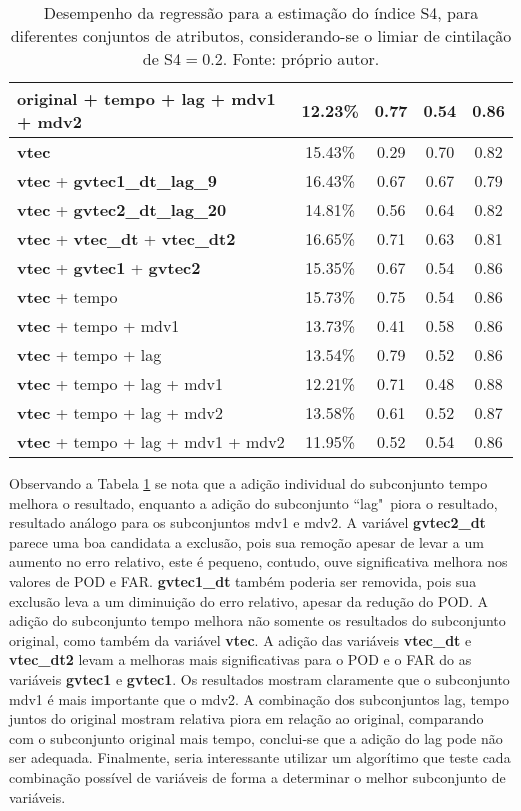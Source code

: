 \begin{table}
\begin{center}
\begin{tabular}{|l|c|c|c|c|}
original + tempo + lag + mdv1 + mdv2	       & 12.23\%	& 0.77	& 0.54	& 0.86 \\ \hline
{\bf vtec}	                               & 15.43\%	& 0.29	& 0.70	& 0.82 \\ \hline
{\bf vtec} + {\bf gvtec1\_dt\_lag\_9}          & 16.43\%        & 0.67  & 0.67  & 0.79 \\ \hline
{\bf vtec} + {\bf gvtec2\_dt\_lag\_20}         & 14.81\%        & 0.56  & 0.64  & 0.82 \\ \hline
{\bf vtec} + {\bf vtec\_dt} + {\bf vtec\_dt2}  & 16.65\%	& 0.71	& 0.63	& 0.81 \\ \hline
{\bf vtec} + {\bf gvtec1} + {\bf gvtec2}       & 15.35\%	& 0.67	& 0.54	& 0.86 \\ \hline
{\bf vtec} + tempo	                       & 15.73\%	& 0.75	& 0.54	& 0.86 \\ \hline
{\bf vtec} + tempo + mdv1	               & 13.73\%	& 0.41	& 0.58	& 0.86 \\ \hline
{\bf vtec} + tempo + lag	               & 13.54\%	& 0.79	& 0.52	& 0.86 \\ \hline
{\bf vtec} + tempo + lag + mdv1	               & 12.21\%	& 0.71	& 0.48	& 0.88 \\ \hline
{\bf vtec} + tempo + lag + mdv2	               & 13.58\%	& 0.61	& 0.52	& 0.87 \\ \hline
{\bf vtec} + tempo + lag + mdv1 + mdv2	       & 11.95\%	& 0.52	& 0.54	& 0.86 \\ \hline
\end{tabular}
\end{center}
\vspace{12pt}
\caption{Desempenho da regressão para a estimação do índice S4, para diferentes conjuntos de atributos, considerando-se o limiar de cintilação de S4$=0.2$. Fonte: próprio autor.}
\label{tab:final_result}
\end{table}

Observando a Tabela \ref{tab:final_result} se nota que a adição individual do subconjunto tempo melhora o resultado, enquanto a adição do subconjunto ``lag"\, piora o resultado, resultado análogo para os subconjuntos mdv1 e mdv2. A variável {\bf gvtec2\_dt} parece uma boa candidata a exclusão, pois sua remoção apesar de levar a um aumento no erro relativo, este é pequeno, contudo, ouve significativa melhora nos valores de POD e FAR. {\bf gvtec1\_dt} também poderia ser removida, pois sua exclusão leva a um diminuição do erro relativo, apesar da redução do POD. A adição do subconjunto tempo melhora não somente os resultados do subconjunto original, como também da variável {\bf vtec}. A adição das variáveis {\bf vtec\_dt} e {\bf vtec\_dt2} levam a melhoras mais significativas para o POD e o FAR do as variáveis {\bf gvtec1} e {\bf gvtec1}. Os resultados mostram claramente que o subconjunto mdv1 é mais importante que o mdv2. A combinação dos subconjuntos lag, tempo juntos do original mostram relativa piora em relação ao original, comparando com o subconjunto original mais tempo, conclui-se que a adição do lag pode não ser adequada. Finalmente, seria interessante utilizar um algorítimo que teste cada combinação possível de variáveis de forma a determinar o melhor subconjunto de variáveis. 

